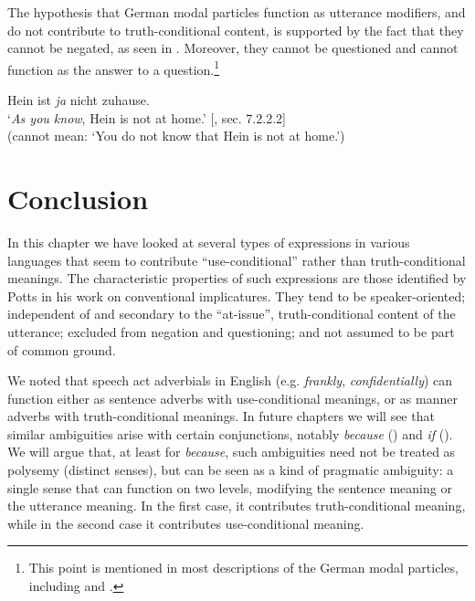 The hypothesis that German modal particles function as utterance modifiers, and do not contribute to truth-conditional content, is supported by the fact that they cannot be negated, as seen in . Moreover, they cannot be questioned and cannot function as the answer to a question.\footnote{This point is mentioned in most descriptions of the German modal particles, including \citet{Bross2012} and \citet{Gutzmann2015}.}


\ea \label{ex:11.28}
Hein ist \textit{ja} nicht zuhause.\\
\glt ‘\textit{As you know}, Hein is not at home.’  [\citealt{Gutzmann2015}, sec. 7.2.2.2]\\
(cannot mean: ‘You do not know that Hein is not at home.’)
\z

\section{Conclusion}\label{sec:11.7}

In this chapter we have looked at several types of expressions in various languages that seem to contribute “use-conditional” rather than truth-conditional meanings. The characteristic properties of such expressions are those identified by Potts in his work on conventional implicatures. They tend to be speaker-oriented; independent of and secondary to the “at-issue”, truth-conditional content of the utterance; excluded from negation and questioning; and not assumed to be part of common ground.



We noted that speech act adverbials in English (e.g. \textit{frankly}, \textit{confidentially}) can function either as sentence adverbs with use-conditional meanings, or as manner adverbs with truth-conditional meanings. In future chapters we will see that similar ambiguities arise with certain conjunctions, notably \textit{because} () and \textit{if} (). We will argue that, at least for \textit{because}, such ambiguities need not be treated as polysemy (distinct senses), but can be seen as a kind of pragmatic ambiguity: a single sense that can function on two levels, modifying the sentence meaning or the utterance meaning. In the first case, it contributes truth-conditional meaning, while in the second case it contributes use-conditional meaning.



\furtherreading



